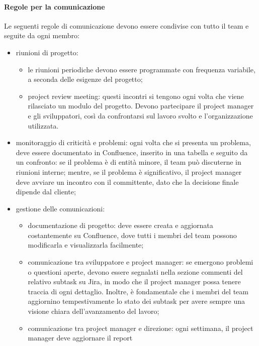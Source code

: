             \paragraph{Regole per la comunicazione}
            Le seguenti regole di comunicazione devono essere condivise con tutto il team e seguite da ogni membro:
            \begin{itemize}
                \item riunioni di progetto:
                \begin{itemize}
                    \item le riunioni periodiche devono essere programmate con frequenza variabile, a seconda delle esigenze del progetto;
                    \item project review meeting: questi incontri si tengono ogni volta che viene rilasciato un modulo del progetto.
                    Devono partecipare il project manager e gli sviluppatori, così da confrontarsi sul lavoro svolto e l'organizzazione utilizzata.
                \end{itemize}
                \item monitoraggio di criticità e problemi: ogni volta che si presenta un problema, deve essere documentato in Confluence,
                inserito in una tabella e seguito da un confronto: se il problema è di entità minore, il team può discuterne in riunioni
                interne; mentre, se il problema è significativo, il project manager deve avviare un incontro con il committente, dato che
                la decisione finale dipende dal cliente;
                \item gestione delle comunicazioni:
                \begin{itemize}
                    \item documentazione di progetto: deve essere creata e aggiornata costantemente su Confluence, dove tutti i membri
                    del team possono modificarla e visualizzarla facilmente;
                    \item comunicazione tra sviluppatore e project manager: se emergono problemi o questioni aperte, devono essere
                    segnalati nella sezione commenti del relativo subtask su Jira, in modo che il project manager possa tenere
                    traccia di ogni dettaglio. Inoltre, è fondamentale che i membri del team aggiornino tempestivamente lo stato
                    dei subtask per avere sempre una visione chiara dell’avanzamento del lavoro;
                    \item comunicazione tra project manager e direzione: ogni settimana, il project manager deve aggiornare il report

\end{itemize}
\end{itemize}
